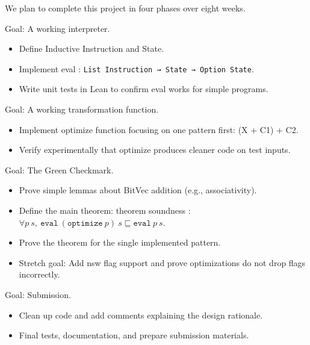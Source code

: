 We plan to complete this project in four phases over eight weeks.

Goal: A working interpreter.
\begin{itemize}
    \item Define Inductive Instruction and State.
    \item Implement eval : \texttt{List Instruction → State → Option State}.
    \item Write unit tests in Lean to confirm eval works for simple programs.
\end{itemize}

Goal: A working transformation function.
\begin{itemize}
    \item Implement optimize function focusing on one pattern first: (X + C1) + C2.
    \item Verify experimentally that optimize produces cleaner code on test inputs.
\end{itemize}

Goal: The Green Checkmark.
\begin{itemize}
    \item Prove simple lemmas about BitVec addition (e.g., associativity).
    \item Define the main theorem: theorem soundness : \(\forall p\ s,\ \texttt{eval}\ (\texttt{optimize}\ p)\ s \sqsubseteq \texttt{eval}\ p\ s\).
    \item Prove the theorem for the single implemented pattern.
    \item Stretch goal: Add nsw flag support and prove optimizations do not drop flags incorrectly.
\end{itemize}

Goal: Submission.
\begin{itemize}
    \item Clean up code and add comments explaining the design rationale.
    \item Final tests, documentation, and prepare submission materials.
\end{itemize}
